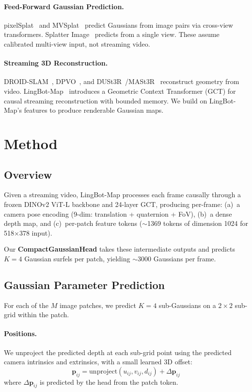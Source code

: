 \documentclass[10pt,twocolumn]{article}
\begin{document}
\paragraph{Feed-Forward Gaussian Prediction.}
pixelSplat~\cite{pixelsplat} and MVSplat~\cite{mvsplat} predict Gaussians from image pairs via cross-view transformers.
Splatter Image~\cite{splatterimage} predicts from a single view.
These assume calibrated multi-view input, not streaming video.

\paragraph{Streaming 3D Reconstruction.}
DROID-SLAM~\cite{droidslam}, DPVO~\cite{dpvo}, and DUSt3R~\cite{dust3r}/MASt3R~\cite{mast3r} reconstruct geometry from video.
LingBot-Map~\cite{lingbotmap} introduces a Geometric Context Transformer (GCT) for causal streaming reconstruction with bounded memory.
We build on LingBot-Map's features to produce renderable Gaussian maps.

\section{Method}
\label{sec:method}

\subsection{Overview}

Given a streaming video, LingBot-Map processes each frame causally through a frozen DINOv2 ViT-L backbone and 24-layer GCT, producing per-frame:
(a)~a camera pose encoding (9-dim: translation + quaternion + FoV),
(b)~a dense depth map, and
(c)~per-patch feature tokens (${\sim}$1369 tokens of dimension 1024 for 518$\times$378 input).

Our \textbf{CompactGaussianHead} takes these intermediate outputs and predicts $K{=}4$ Gaussian surfels per patch, yielding ${\sim}$3000 Gaussians per frame.

\subsection{Gaussian Parameter Prediction}

For each of the $M$ image patches, we predict $K{=}4$ sub-Gaussians on a $2{\times}2$ sub-grid within the patch.

\paragraph{Positions.}
We unproject the predicted depth at each sub-grid point using the predicted camera intrinsics and extrinsics, with a small learned 3D offset:
\begin{equation}
    \mathbf{p}_{ij} = \text{unproject}(u_{ij}, v_{ij}, d_{ij}) + \Delta\mathbf{p}_{ij}
\end{equation}
where $\Delta\mathbf{p}_{ij}$ is predicted by the head from the patch token.
\end{document}
